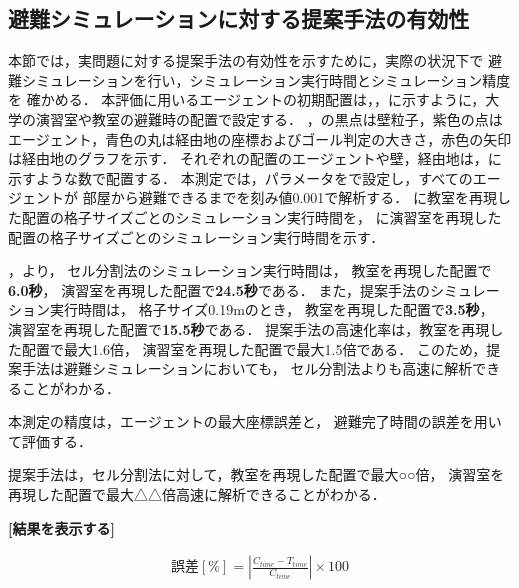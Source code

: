 \subsection{避難シミュレーションに対する提案手法の有効性}
\label{sec:5_real}
本節では，実問題に対する提案手法の有効性を示すために，実際の状況下で
避難シミュレーションを行い，シミュレーション実行時間とシミュレーション精度を
確かめる．
本評価に用いるエージェントの初期配置は，，に示すように，大学の演習室や教室の避難時の配置で設定する．
，の黒点は壁粒子，紫色の点はエージェント，青色の丸は経由地の座標およびゴール判定の大きさ，赤色の矢印は経由地のグラフを示す．
それぞれの配置のエージェントや壁，経由地は，に示すような数で配置する．
本測定では，パラメータをで設定し，すべてのエージェントが
部屋から避難できるまでを刻み値0.001で解析する．
に教室を再現した配置の格子サイズごとのシミュレーション実行時間を，
に演習室を再現した配置の格子サイズごとのシミュレーション実行時間を示す．

，より，
セル分割法のシミュレーション実行時間は，
教室を再現した配置で\textbf{6.0秒}，
演習室を再現した配置で\textbf{24.5秒}である．
また，提案手法のシミュレーション実行時間は，
格子サイズ0.19mのとき，
教室を再現した配置で\textbf{3.5秒}，
演習室を再現した配置で\textbf{15.5秒}である．
提案手法の高速化率は，教室を再現した配置で最大1.6倍，
演習室を再現した配置で最大1.5倍である．
このため，提案手法は避難シミュレーションにおいても，
セル分割法よりも高速に解析できることがわかる．

本測定の精度は，エージェントの最大座標誤差と，
避難完了時間の誤差を用いて評価する．


提案手法は，セル分割法に対して，教室を再現した配置で最大○○倍，
演習室を再現した配置で最大△△倍高速に解析できることがわかる．



\textbf{
[結果を表示する]
}


\begin{eqnarray}
\label{eq:gosa_hinan}
\mbox{誤差$[\%]$} = \left | \frac{C_{time} - T_{time}}{C_{time}} \right | \times 100
\end{eqnarray}



